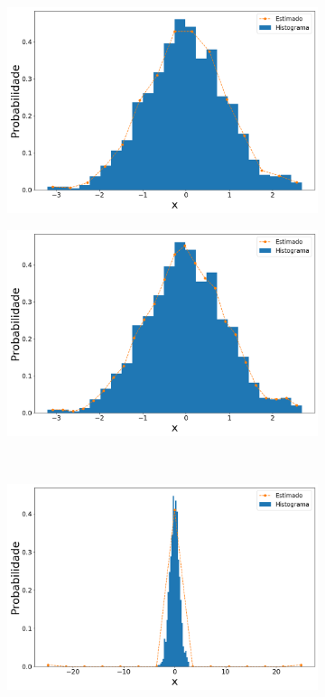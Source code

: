 \begin{figure}[H]
	\centering\begin{subfigure}[b]{0.45\textwidth}
		\centering 
		\includegraphics[width=\linewidth]{./figuras/Linspace_normal_15_1000_0}
		\caption{}
		\label{fig:lin_norm15_data}
	\end{subfigure}
	\hfill
	\begin{subfigure}[b]{0.45\textwidth}
		\centering 
		\includegraphics[width=\linewidth]{./figuras/Linspace_normal_25_1000_0}
		\caption{}
		\label{fig:lin_norm25_data}
	\end{subfigure}
	\\
	\begin{subfigure}[b]{0.45\textwidth}
		\centering 
		\includegraphics[width=\linewidth]{./figuras/Linspace_normal_15_1000_25}

\end{subfigure}
\end{figure}

